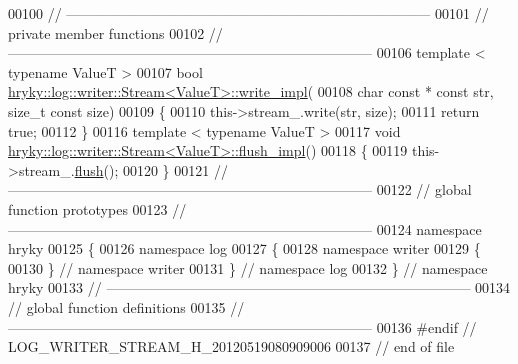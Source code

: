 \begin{DoxyCode}
00100 \textcolor{comment}{//
      ------------------------------------------------------------------------------}
00101 \textcolor{comment}{// private member functions}
00102 \textcolor{comment}{//
      ------------------------------------------------------------------------------}
00106 \textcolor{comment}{}\textcolor{keyword}{template} < \textcolor{keyword}{typename} ValueT >
00107 \textcolor{keywordtype}{bool} \hyperlink{classhryky_1_1log_1_1writer_1_1_stream}{hryky::log::writer::Stream<ValueT>::write_impl}(
00108     \textcolor{keywordtype}{char} \textcolor{keyword}{const} * \textcolor{keyword}{const} str, \textcolor{keywordtype}{size\_t} \textcolor{keyword}{const} size)
00109 \{
00110     this->stream\_.write(str, size);
00111     \textcolor{keywordflow}{return} \textcolor{keyword}{true};
00112 \}
00116 \textcolor{keyword}{template} < \textcolor{keyword}{typename} ValueT >
00117 \textcolor{keywordtype}{void} \hyperlink{classhryky_1_1log_1_1writer_1_1_stream}{hryky::log::writer::Stream<ValueT>::flush_impl}()
00118 \{
00119     this->stream\_.\hyperlink{classhryky_1_1log_1_1writer_1_1_base_a96f6db3720375594d5e439e37934e1ee}{flush}();
00120 \}
00121 \textcolor{comment}{//
      ------------------------------------------------------------------------------}
00122 \textcolor{comment}{// global function prototypes}
00123 \textcolor{comment}{//
      ------------------------------------------------------------------------------}
00124 \textcolor{keyword}{namespace }hryky
00125 \{
00126 \textcolor{keyword}{namespace }log
00127 \{
00128 \textcolor{keyword}{namespace }writer
00129 \{
00130 \} \textcolor{comment}{// namespace writer}
00131 \} \textcolor{comment}{// namespace log}
00132 \} \textcolor{comment}{// namespace hryky}
00133 \textcolor{comment}{//
      ------------------------------------------------------------------------------}
00134 \textcolor{comment}{// global function definitions}
00135 \textcolor{comment}{//
      ------------------------------------------------------------------------------}
00136 \textcolor{preprocessor}{#endif // LOG\_WRITER\_STREAM\_H\_20120519080909006}
00137 \textcolor{preprocessor}{}\textcolor{comment}{// end of file}
\end{DoxyCode}
